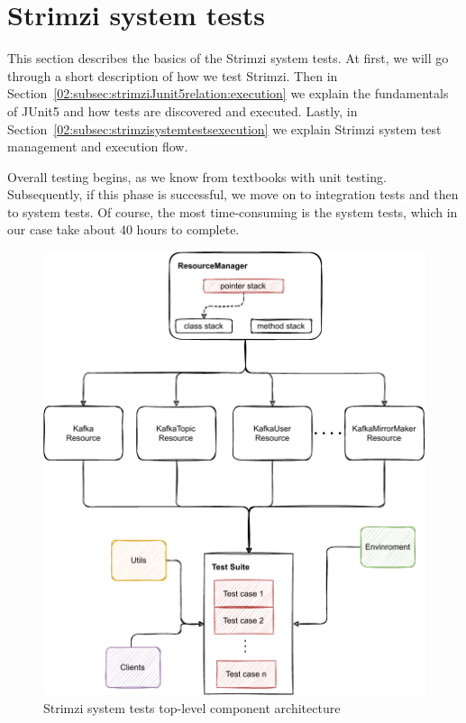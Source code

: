 \section{Strimzi system tests}
\label{02:sec:strimzisystemtests}

This section describes the basics of the Strimzi system tests.
At first, we will go through a short description of how we test Strimzi.
Then in Section~\ref{02:subsec:strimziJunit5relation:execution} we explain the fundamentals of JUnit5 and how tests are discovered and executed.
Lastly, in Section~\ref{02:subsec:strimzisystemtestsexecution} we explain Strimzi system test management and execution flow.

Overall testing begins, as we know from textbooks with unit testing.
Subsequently, if this phase is successful, we move on to integration tests and then to system tests.
Of course, the most time-consuming is the system tests, which in our case take about 40 hours to complete.
\begin{figure}[!ht]
    \centering
    \includegraphics[scale=0.70]{obrazky-figures/02-preliminaries/04-strimzi-system-tests/01-architecture-overall}
    \caption{Strimzi system tests top-level component architecture}
    \label{02d:fig:strimzisystemtestarch}
\end{figure}
